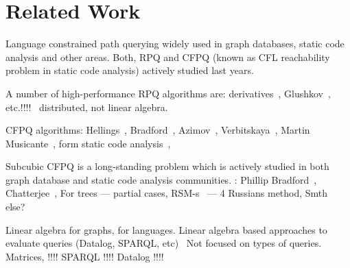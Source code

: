 \section{Related Work}

Language constrained path querying widely used in graph databases, static code analysis and other areas.
Both, RPQ and CFPQ (known as CFL reachability problem in static code analysis) actively studied last years.

A number of high-performance RPQ algorithms are: derivatives~\cite{10.1145/2949689.2949711}, Glushkov~\cite{Wang2019}, etc.!!!!~\cite{!!!} distributed, not linear algebra.

CFPQ algorithms: Hellings~\cite{hellingsRelational}, Bradford~\cite{8249039}, Azimov~\cite{Azimov:2018:CPQ:3210259.3210264}, Verbitskaya~\cite{10.1007/978-3-319-41579-6_22}, Martin Musicante~\cite{10.1007/978-3-319-91662-0_17,Medeiros:2018:EEC:3167132.3167265}, form static code analysis~\cite{!!!}, 

Subcubic CFPQ is a long-standing problem which is actively studied in both graph database and static code analysis communities. : Phillip Bradford~\cite{Bradford2017EfficientEP}, Chatterjee~\cite{10.1145/3158118}, For trees --- partial cases, RSM-s~\cite{rsm:analysis:10.1007/3-540-44585-4_18} --- 4 Russians method, Smth else?~\cite{zhang2020conditional,pavlogiannis2020finegrained}

Linear algebra for graphs, for languages. 
Linear algebra based approaches to evaluate queries (Datalog, SPARQL, etc)~\cite{10.1145/3302424.3303962,DBLP:journals/corr/MetzlerM15a} Not focused on types of queries.
Matrices, !!!!
SPARQL !!!!
Datalog !!!!	